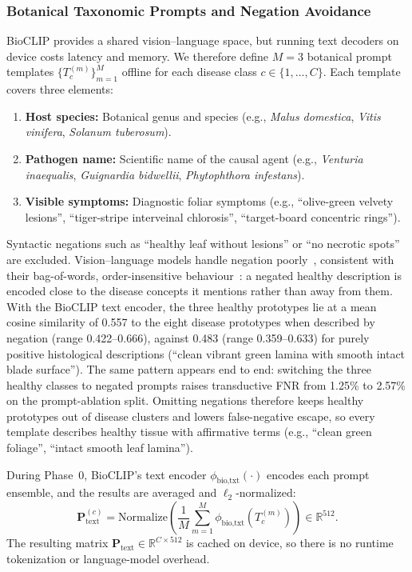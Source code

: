 \subsubsection{Botanical Taxonomic Prompts and Negation Avoidance}
BioCLIP provides a shared vision--language space, but running text decoders on device costs latency and memory. We therefore define $M = 3$ botanical prompt templates $\{T_c^{(m)}\}_{m=1}^M$ offline for each disease class $c \in \{1, \dots, C\}$. Each template covers three elements:
\begin{enumerate}
    \item \textbf{Host species:} Botanical genus and species (e.g., \textit{Malus domestica}, \textit{Vitis vinifera}, \textit{Solanum tuberosum}).
    \item \textbf{Pathogen name:} Scientific name of the causal agent (e.g., \textit{Venturia inaequalis}, \textit{Guignardia bidwellii}, \textit{Phytophthora infestans}).
    \item \textbf{Visible symptoms:} Diagnostic foliar symptoms (e.g., ``olive-green velvety lesions'', ``tiger-stripe interveinal chlorosis'', ``target-board concentric rings'').
\end{enumerate}
Syntactic negations such as ``healthy leaf without lesions'' or ``no necrotic spots'' are excluded. Vision--language models handle negation poorly~\cite{alhamoud2025vision}, consistent with their bag-of-words, order-insensitive behaviour~\cite{yuksekgonul2023when}: a negated healthy description is encoded close to the disease concepts it mentions rather than away from them. With the BioCLIP text encoder, the three healthy prototypes lie at a mean cosine similarity of 0.557 to the eight disease prototypes when described by negation (range 0.422--0.666), against 0.483 (range 0.359--0.633) for purely positive histological descriptions (``clean vibrant green lamina with smooth intact blade surface''). The same pattern appears end to end: switching the three healthy classes to negated prompts raises transductive FNR from 1.25\% to 2.57\% on the prompt-ablation split. Omitting negations therefore keeps healthy prototypes out of disease clusters and lowers false-negative escape, so every template describes healthy tissue with affirmative terms (e.g., ``clean green foliage'', ``intact smooth leaf lamina'').

During Phase~0, BioCLIP's text encoder $\phi_{\text{bio,txt}}(\cdot)$ encodes each prompt ensemble, and the results are averaged and $\ell_2$-normalized:
\begin{equation}
    \mathbf{P}_{\text{text}}^{(c)} = \text{Normalize}\left(\frac{1}{M}\sum_{m=1}^M \phi_{\text{bio,txt}}(T_c^{(m)})\right) \in \mathbb{R}^{512}.
\end{equation}
The resulting matrix $\mathbf{P}_{\text{text}} \in \mathbb{R}^{C \times 512}$ is cached on device, so there is no runtime tokenization or language-model overhead.

